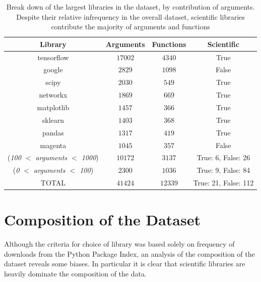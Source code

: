 \begin{table}[h!]
    \begin{center}
    \begin{tabular}{c | c | c | c}
        Library      & Arguments     & Functions  & Scientific \\
        \hline
        tensorflow   & $ 17002 $     & $ 4340 $ & True \\
        google   & $ 2829 $      & $ 1098 $ & False \\
        scipy    & $ 2030 $      & $ 549 $ & True \\
        networkx     & $ 1869 $      & $ 669 $ & True \\
        matplotlib   & $ 1457 $      & $ 366 $ & True \\
        sklearn      & $ 1403 $      & $ 368 $ & True \\
        pandas   & $ 1317 $      & $ 419 $ & True \\
        magenta      & $ 1045 $      & $ 357 $ & False \\
        (\textit{100 $<$ arguments $<$ 1000})   & $ 10172 $     & $ 3137 $ & True: 6, False: 26 \\
        (\textit{0 $<$ arguments $<$ 100})      & $ 2300 $      & $ 1036 $ & True: 9, False: 84 \\
        \hline
        \hline
        TOTAL    & $ 41424 $     & $ 12339 $ & True: 21, False: 112 \\
    \end{tabular}
    \caption {Break down of the largest libraries in the dataset, by contribution of arguments. Despite their relative infrequency in the overall dataset, scientific libraries contribute the majority of arguments and functions}
    \label{table:breakdown_by_library}
    \end{center}
\end{table}

\section{Composition of the Dataset} %
\label{sec:composition_of_the_dataset}

Although the criteria for choice of library was based solely on frequency of downloads from the Python Package Index, an analysis of the composition of the dataset reveals some biases.
In particular it is clear that scientific libraries are heavily dominate the composition of the data.

